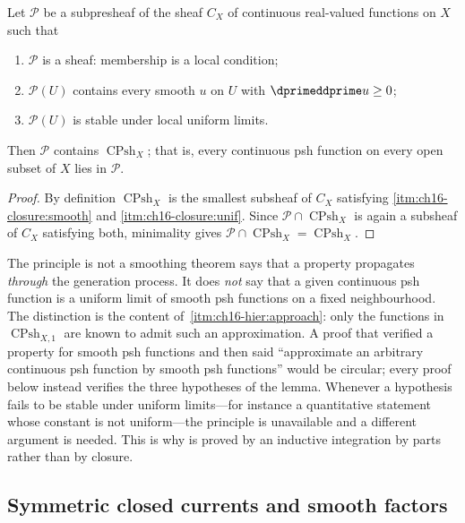 \begin{lemma}
\label{lem:ch16-cpsh-induction}
Let $\mathscr P$ be a subpresheaf of the sheaf $C_X$ of continuous
real-valued functions on $X$ such that
\begin{enumerate}
\item\label{itm:ch16-closure:sheaf} $\mathscr P$ is a sheaf: membership is a
 local condition;
\item\label{itm:ch16-closure:smooth} $\mathscr P(U)$ contains every smooth
 $u$ on $U$ with $\dprimeddprime u\geq0$;
\item\label{itm:ch16-closure:unif} $\mathscr P(U)$ is stable under local
 uniform limits.
\end{enumerate}
Then $\mathscr P$ contains $\operatorname{CPsh}_X$; that is, every
continuous psh function on every open subset of $X$ lies in $\mathscr P$.
\end{lemma}

\begin{proof}
By definition $\operatorname{CPsh}_X$ is the smallest subsheaf of $C_X$
satisfying \cref{itm:ch16-closure:smooth} and \cref{itm:ch16-closure:unif}.
Since $\mathscr P\cap\operatorname{CPsh}_X$ is again a subsheaf of $C_X$
satisfying both, minimality gives
$\mathscr P\cap\operatorname{CPsh}_X=\operatorname{CPsh}_X$.
\end{proof}

\begin{warning}{The principle is not a smoothing theorem}
 says that a property propagates \emph{through}
the generation process.  It does \emph{not} say that a given continuous psh
function is a uniform limit of smooth psh functions on a fixed neighbourhood.
The distinction is the content of
\,\cref{itm:ch16-hier:approach}: only the
functions in $\operatorname{CPsh}_{X,1}$ are known to admit such an
approximation.  A proof that verified a property for smooth psh functions and
then said ``approximate an arbitrary continuous psh function by smooth psh
functions'' would be circular; every proof below instead verifies the three
hypotheses of the lemma.  Whenever a hypothesis fails to be stable under
uniform limits---for instance a quantitative statement whose constant is not
uniform---the principle is unavailable and a different argument is needed.
This is why  is proved by an inductive integration by parts
rather than by closure.
\end{warning}

\subsection{Symmetric closed currents and smooth factors}
\label{sec:ch16-symmetric-leibniz}

